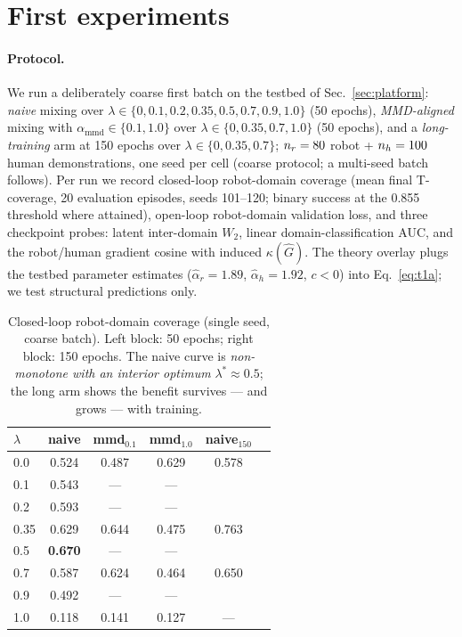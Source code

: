 \section{First experiments}
\label{sec:experiments}

\paragraph{Protocol.}
We run a deliberately coarse first batch on the testbed of Sec.~\ref{sec:platform}: \emph{naive} mixing over $\lambda \in \{0, 0.1, 0.2, 0.35, 0.5, 0.7, 0.9, 1.0\}$ (50 epochs), \emph{MMD-aligned} mixing with $\alpha_{\mathrm{mmd}} \in \{0.1, 1.0\}$ over $\lambda \in \{0, 0.35, 0.7, 1.0\}$ (50 epochs), and a \emph{long-training} arm at 150 epochs over $\lambda \in \{0, 0.35, 0.7\}$; $n_r = 80$ robot + $n_h = 100$ human demonstrations, one seed per cell (coarse protocol; a multi-seed batch follows).
Per run we record closed-loop robot-domain coverage (mean final T-coverage, 20 evaluation episodes, seeds 101--120; binary success at the 0.855 threshold where attained), open-loop robot-domain validation loss, and three checkpoint probes: latent inter-domain $W_2$, linear domain-classification AUC, and the robot/human gradient cosine with induced $\kappa(\hat G)$.
The theory overlay plugs the testbed parameter estimates ($\hat\alpha_r = 1.89$, $\hat\alpha_h = 1.92$, $c < 0$) into Eq.~\eqref{eq:t1a}; we test structural predictions only.

\begin{table}[t]
  \centering
  \small
  \caption{Closed-loop robot-domain coverage (single seed, coarse batch).
  Left block: 50 epochs; right block: 150 epochs.
  The naive curve is \emph{non-monotone with an interior optimum} $\lambda^* \approx 0.5$; the long arm shows the benefit survives --- and grows --- with training.}
  \label{tab:batch1}
  \begin{tabular}{lc|cc|cc}
    \toprule
    $\lambda$ & naive & mmd$_{0.1}$ & mmd$_{1.0}$ & naive$_{150}$ & \\
    \midrule
    0.0  & 0.524 & 0.487 & 0.629 & 0.578 & \\
    0.1  & 0.543 & --- & --- & & \\
    0.2  & 0.593 & --- & --- & & \\
    0.35 & 0.629 & 0.644 & 0.475 & 0.763 & \\
    0.5  & \textbf{0.670} & --- & --- & & \\
    0.7  & 0.587 & 0.624 & 0.464 & 0.650 & \\
    0.9  & 0.492 & --- & --- & & \\
    1.0  & 0.118 & 0.141 & 0.127 & --- & \\
    \bottomrule
  \end{tabular}
\end{table}

